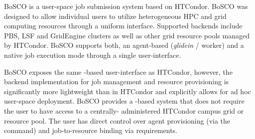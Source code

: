 \documentclass{sig-alternate}
\begin{document}


BoSCO is a user-space job submission system based on HTCondor. BoSCO was
designed to allow individual users to utilize heterogeneous HPC and grid
computing resources through a uniform interface. Supported backends include
PBS, LSF and GridEngine clusters as well as other  grid resource pools managed
by HTCondor. BoSCO supports both, an agent-based (\textit{glidein} / worker)
and a native job execution mode through a single user-interface.

BoSCO exposes the same -based user-interface as HTCondor,
however, the backend implementation for job management and resource
provisioning is significantly more lightweight than in HTCondor and explicitly
allows for ad hoc user-space deployment. BoSCO provides a \pilot-based
system that does not require the user to have access to a centrally-
administered HTCondor campus grid or  resource pool. The user has direct
control over \pilot agent provisioning (via the 
command) and job-to-resource binding via  requirements.
\end{document}
